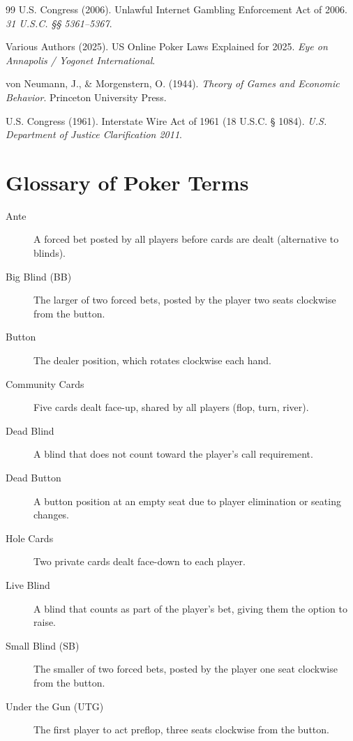 \documentclass[11pt,a4paper]{article}
\begin{document}
\begin{thebibliography}{99}
U.S. Congress (2006).
Unlawful Internet Gambling Enforcement Act of 2006.
\textit{31 U.S.C. §§ 5361–5367}.

Various Authors (2025).
US Online Poker Laws Explained for 2025.
\textit{Eye on Annapolis / Yogonet International}.

von Neumann, J., \& Morgenstern, O. (1944).
\textit{Theory of Games and Economic Behavior}.
Princeton University Press.

U.S. Congress (1961).
Interstate Wire Act of 1961 (18 U.S.C. § 1084).
\textit{U.S. Department of Justice Clarification 2011}.

\end{thebibliography}

\appendix

\section{Glossary of Poker Terms}

\begin{description}
    \item[Ante] A forced bet posted by all players before cards are dealt (alternative to blinds).
    \item[Big Blind (BB)] The larger of two forced bets, posted by the player two seats clockwise from the button.
    \item[Button] The dealer position, which rotates clockwise each hand.
    \item[Community Cards] Five cards dealt face-up, shared by all players (flop, turn, river).
    \item[Dead Blind] A blind that does not count toward the player's call requirement.
    \item[Dead Button] A button position at an empty seat due to player elimination or seating changes.
    \item[Hole Cards] Two private cards dealt face-down to each player.
    \item[Live Blind] A blind that counts as part of the player's bet, giving them the option to raise.
    \item[Small Blind (SB)] The smaller of two forced bets, posted by the player one seat clockwise from the button.
    \item[Under the Gun (UTG)] The first player to act preflop, three seats clockwise from the button.
\end{description}
\end{document}
